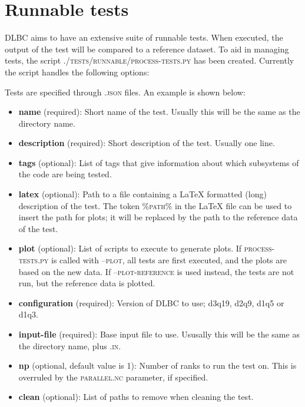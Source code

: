 \documentclass{article}
\begin{document}
\section{Runnable tests}

DLBC aims to have an extensive suite of runnable tests. When executed, the output of the test will be compared to a reference dataset.
To aid in managing tests, the script \textsc{./tests/runnable/process-tests.py} has been created.
Currently the script handles the following options:



\noindent
Tests are specified through \textsc{.json} files. An example is shown below:



\begin{itemize}
\item \textbf{name} (required): Short name of the test. Usually this will be the same as the directory name.
\item \textbf{description} (required): Short description of the test. Usually one line.
\item \textbf{tags} (optional): List of tags that give information about which subsystems of the code are being tested.
\item \textbf{latex} (optional): Path to a file containing a LaTeX formatted (long) description of the test. The token \textsc{\%path\%} in the LaTeX file can be used to insert the path for plots; it will be replaced by the path to the reference data of the test.
\item \textbf{plot} (optional): List of scripts to execute to generate plots. If \textsc{process-tests.py} is called with \textsc{--plot}, all tests are first executed, and the plots are based on the new data. If \textsc{--plot-reference} is used instead, the tests are not run, but the reference data is plotted.
\item \textbf{configuration} (required): Version of DLBC to use; d3q19, d2q9, d1q5 or d1q3.
\item \textbf{input-file} (required): Base input file to use. Ususally this will be the same as the directory name, plus \textsc{.in}.
\item \textbf{np} (optional, default value is 1): Number of ranks to run the test on. This is overruled by the \textsc{parallel.nc} parameter, if specified.
\item \textbf{clean} (optional): List of paths to remove when cleaning the test.

\end{itemize}
\end{document}
